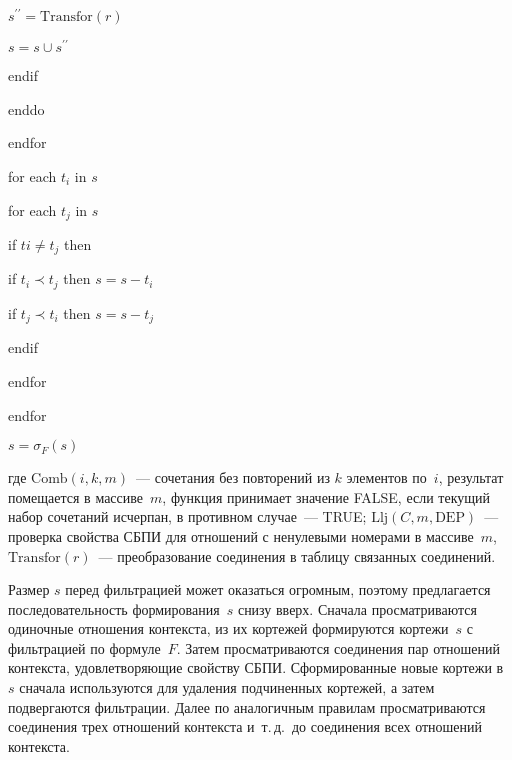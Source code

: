 \begin{multicols}{2}
\hspace*{3mm}$s^{\prime\prime}=\mathrm{Transfor}(r)$

\hspace*{3mm}$s=s \cup  s^{\prime\prime}$

\hspace*{2mm}endif

\hspace*{1mm}enddo

\noindent
endfor

\noindent
for each $t_i$ in $s$

\hspace*{1mm}for each $t_j$ in $s$

\hspace*{2mm}if $ti\not=  t_j$ then

\hspace*{3mm}if $t_i \prec t_j$ then $s=s - t_i$

\hspace*{3mm}if $t_j \prec t_i$ then $s=s - t_j$

\hspace*{2mm}endif

\hspace*{1mm}endfor

\noindent
endfor

\noindent
$s=\sigma_F(s)$



\smallskip

\noindent
где $\mathrm{Comb}\left(i,k,m\right)$~--- сочетания без повторений из $k$ элементов по~$i$, 
результат помещается в массиве~$m$, функция принимает значение FALSE, 
если текущий набор сочетаний исчерпан, в противном случае~--- TRUE; 
$\mathrm{Llj}\left(C,m,\mathrm{DEP}\right)$~--- проверка свойства СБПИ для отношений с ненулевыми 
номерами в массиве~$m$, $\mathrm{Transfor}(r)$~--- преобразование соединения в 
таблицу связанных соединений.
  
  Размер $s$ перед фильтрацией может оказаться огромным, поэтому 
предлагается последовательность формирования~$s$ снизу вверх. Сначала 
просматриваются одиночные отношения контекста, из их кортежей 
формируются кортежи~$s$ с фильтрацией по формуле~$F$. Затем 
просматриваются соединения пар отношений контекста, удовлетворяющие 
свойству СБПИ. Сформированные новые кортежи в~$s$ сначала используются 
для удаления подчиненных кортежей, а затем подвергаются фильтрации. Далее 
по аналогичным правилам просматриваются соединения трех отношений 
контекста и~т.\,д.\ до соединения всех отношений контекста.
  

\end{multicols}
